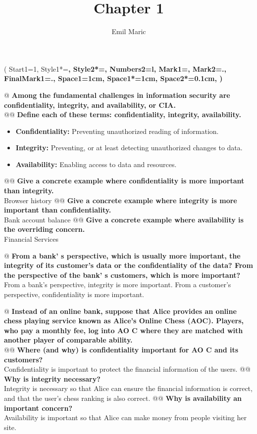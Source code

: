 \documentclass{article}
\begin{document}
\title{Chapter 1}
\author{Emil Maric}
\maketitle

\begin{easylist}
 	\ListProperties(
 		Start1=1,
	  	Style1*=\bfseries,
	  	Style2*=\bfseries,
	  	Numbers2=l,
	  	Mark1={},
	  	Mark2={.},
	  	FinalMark1={.},
	  	Space1=1cm,
	  	Space1*=1cm,
	  	Space2*=0.1cm,
	)
  
 	@  \textbf{Among the fundamental challenges in information security are confidentiality, integrity, and availability, or CIA.}\\
 	@@ \textbf{Define each of these terms: confidentiality, integrity, availability.}
 		\begin{itemize}
 			\item \textbf{Confidentiality:} Preventing unauthorized reading of information.
 			\item \textbf{Integrity:} Preventing, or at least detecting unauthorized changes to data.
 			\item \textbf{Availability:} Enabling access to data and resources.
 		\end{itemize}
 	@@ \textbf{Give a concrete example where confidentiality is more important than integrity.}\\
 		Browser history
 	@@ \textbf{Give a concrete example where integrity is more important than confidentiality.}\\
 		Bank account balance
 	@@ \textbf{Give a concrete example where availability is the overriding concern.}\\
 		Financial Services

 	@ \textbf{From a bank' s perspective, which is usually more important, the integrity of its customer's data or the confidentiality of the data? From the perspective of the bank' s customers, which is more important?}\\
 		From a bank's perspective, integrity is more important. From a customer's perspective, confidentiality is more important.%
 	
 	@ \textbf{Instead of an online bank, suppose that Alice provides an online chess playing service known as Alice's Online Chess (AOC). Players, who pay a monthly fee, log into AO C where they are matched with another player of comparable ability.}\\
 	@@ \textbf{Where (and why) is confidentiality important for AO C and its
customers?}\\
 		Confidentiality is important to protect the financial information of the users.
 	@@ \textbf{Why is integrity necessary?}\\
 		Integrity is necessary so that Alice can ensure the financial information is correct, and that the user's chess ranking is also correct.
 	@@ \textbf{Why is availability an important concern?}\\
 		Availability is important so that Alice can make money from people visiting her site.
 	

\end{easylist}
\end{document}
